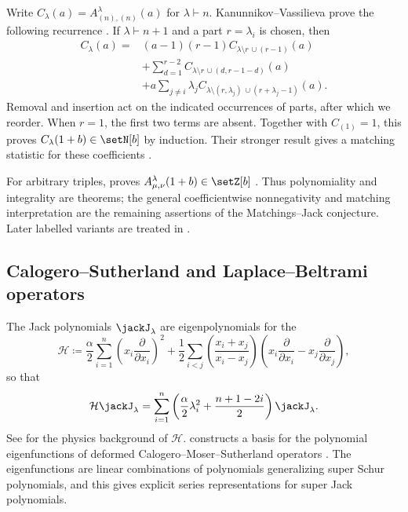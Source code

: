 Write $C_\lambda(a)=A^\lambda_{(n),(n)}(a)$ for $\lambda\vdash n$.
Kanunnikov--Vassilieva prove the following recurrence
\cite[Thm.~2]{KanunnikovVassilieva2016}. If $\lambda\vdash n+1$
and a part $r=\lambda_i$ is chosen, then
\[
 \begin{aligned}
 C_\lambda(a)={}&(a-1)(r-1)C_{\lambda\setminus r\,\cup(r-1)}(a)\\
 &+\sum_{d=1}^{r-2}C_{\lambda\setminus r\,\cup(d,r-1-d)}(a)\\
 &+a\sum_{j\neq i}\lambda_j
 C_{\lambda\setminus(r,\lambda_j)\,\cup(r+\lambda_j-1)}(a).
 \end{aligned}
\]
Removal and insertion act on the indicated occurrences of parts,
after which we reorder. When $r=1$, the first two terms are absent.
Together with $C_{(1)}=1$, this proves
$C_\lambda(1+b)\in\setN[b]$ by induction.
Their stronger result gives a matching statistic for these coefficients
\cite[Thm.~3]{KanunnikovVassilieva2016}.

For arbitrary triples,  proves
$A^\lambda_{\mu,\nu}(1+b)\in\setZ[b]$
\cite{BenDali2023Integrality}.
Thus polynomiality and integrality are theorems; the general
coefficientwise nonnegativity and matching interpretation are the
remaining assertions of the Matchings--Jack conjecture.
Later labelled variants are treated in
\cite{KanunnikovPromyslovVassilieva2024}.

\subsection[jackLaplaceBeltrami]{Calogero--Sutherland and Laplace--Beltrami operators}

The Jack polynomials $\jackJ_\lambda$ are eigenpolynomials for the
\label{calogeroSutherlandOperator}
\[
\mathcal{H}
\coloneqq
\frac{\alpha}{2} \sum_{i=1}^n
\left(x_i\frac{\partial}{\partial x_i}\right)^2
+
\frac{1}{2} \sum_{i\lt j}
\left( \frac{x_i+x_j}{ x_i - x_j } \right)
\left(
  x_i \frac{\partial}{\partial x_i}
  - x_j \frac{\partial}{\partial x_j}
\right),
\]
so that
\[
\mathcal{H} \jackJ_\lambda
=
\sum_{i=1}^n
\left( \frac{\alpha}{2} \lambda_i^2 + \frac{n+1-2i}{2} \right)
\jackJ_\lambda.
\]
See \cite{Sutherland1971} for the physics background of $\mathcal{H}$.
 constructs a basis for the polynomial eigenfunctions of
deformed Calogero--Moser--Sutherland operators \cite{Hallnas2007x}.  The
eigenfunctions are linear combinations of polynomials generalizing super Schur
polynomials, and this gives explicit series representations for super Jack
polynomials.

